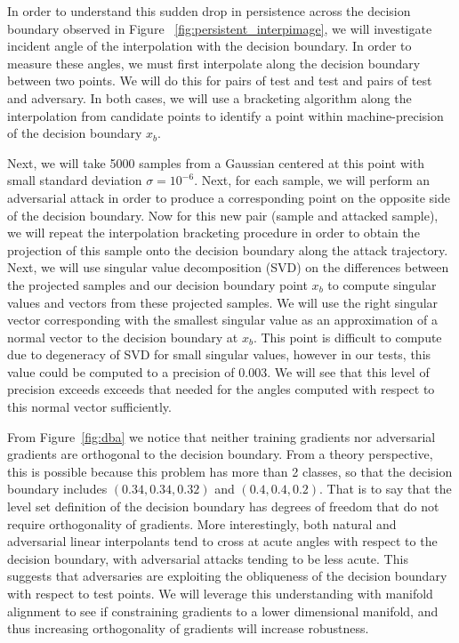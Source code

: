 In order to understand this sudden drop in persistence across the decision boundary observed in Figure ~\ref{fig:persistent_interpimage}, we will investigate incident angle of the interpolation with the decision boundary. In order to measure these angles, we must first interpolate along the decision boundary between two points. We will do this for pairs of test and test and pairs of test and adversary. In both cases, we will use a bracketing algorithm along the interpolation from candidate points to identify a point within machine-precision of the decision boundary $x_b$. 

Next, we will take 5000 samples from a Gaussian centered at this point with small standard deviation $\sigma = 10^{-6}$. Next, for each sample, we will perform an adversarial attack in order to produce a corresponding point on the opposite side of the decision boundary. Now for this new pair (sample and attacked sample), we will repeat the interpolation bracketing procedure in order to obtain the projection of this sample onto the decision boundary along the attack trajectory. Next, we will use singular value decomposition (SVD) on the differences between the projected samples and our decision boundary point $x_b$  to compute singular values and vectors from these projected samples. We will use the right singular vector corresponding with the smallest singular value as an approximation of a normal vector to the decision boundary at $x_b$. This point is difficult to compute due to degeneracy of SVD for small singular values, however in our tests, this value could be computed to a precision of 0.003. We will see that this level of precision exceeds exceeds that needed for the angles computed with respect to this normal vector sufficiently. 

From Figure~\ref{fig:dba} we notice that neither training gradients nor adversarial gradients are orthogonal to the decision boundary. From a theory perspective, this is possible because this problem has more than 2 classes, so that the decision boundary includes $(0.34, 0.34, 0.32)$ and $(0.4, 0.4, 0.2)$. That is to say that the level set definition of the decision boundary has degrees of freedom that do not require orthogonality of gradients. More interestingly, both natural and adversarial linear interpolants tend to cross at acute angles with respect to the decision boundary, with adversarial attacks tending to be less acute. This suggests that adversaries are exploiting the obliqueness of the decision boundary with respect to test points. We will leverage this understanding with manifold alignment to see if constraining gradients to a lower dimensional manifold, and thus increasing orthogonality of gradients will increase robustness. 

